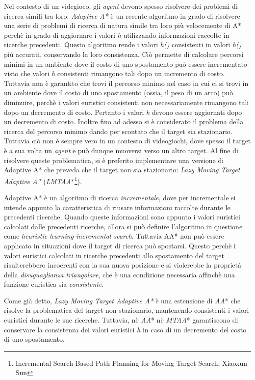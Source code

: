 \documentclass[11pt]{book}
\begin{document}
\par{Nel contesto di un videgioco, gli \emph{agent} devono spesso risolvere dei problemi di ricerca simili tra loro. \emph{Adaptive A*} \`e un recente algoritmo in grado di risolvere una serie di problemi di ricerca di natura simile tra loro pi\`u velocemente di A* perch\`e in grado di aggiornare i valori \emph{h} utilizzando informazioni raccolte in ricerche precedenti. Questo algoritmo rende i valori \emph{h()} consistenti in valori \emph{h()} pi\`u accurati, conservando la loro consistenza. Ci\`o permette di calcolare percorsi minimi in un ambiente dove il costo di uno spostamento pu\`o essere incrementato visto che valori \emph{h} consistenti rimangono tali dopo un incremento di costo. Tuttavia non \`e garantito che trovi il percorso minimo nel caso in cui ci si trovi in un ambiente dove il costo di uno spostamento (ossia, il peso di un arco) pu\`o diminuire, perch\`e i valori euristici consistenti non necessariamente rimangono tali dopo un decremento di costo. Pertanto i valori \emph{h} devono essere aggiornati dopo un decremento di costo. Inoltre fino ad adesso si \`e considerato il problema della ricerca del percorso minimo dando per scontato che il target sia stazionario. Tuttavia ci\`o non \`e sempre vero in un contesto di videogiochi, dove spesso il target \`e a sua volta un \emph{agent} e pu\`o dunque muoversi verso un altro target. Al fine di risolvere queste problematica, si \`e preferito implementare una versione di Adaptive A* che preveda che il target non sia stazionario: \emph{Lazy Moving Target Adaptive A*} (\emph{LMTAA}*\footnote{Incremental Search-Based Path Planning for Moving Target Search, Xiaoxun Sun}).}

\par{Adaptive A* \`e un algoritmo  di ricerca \emph{incrementale}, dove per incrementale si intende appunto la caratteristica di riusare informazioni raccolte durante le precedenti ricerche. Quando queste informazioni sono appunto i valori euristici calcolati dalle precedenti ricerche, allora si pu\`o definire l'algoritmo in questione come \emph{heuristic learning incremental search}. Tuttavia AA* non pu\`o essere applicato in situazioni dove il target di ricerca pu\`o spostarsi. Questo perch\`e i valori euristici calcolati in ricerche precedenti allo spostamento del target risulterebbero incoerenti con la sua nuova posizione e si violerebbe la propriet\`a della \emph{disuguaglianza triangolare}, che \`e una condizione necessaria affinch\`e una funzione euristica sia \emph{consistente}.}
\par{Come gi\`a detto, \emph{Lazy Moving Target Adaptive A*} \`e una estensione di \emph{AA}* che risolve la problematica del target non stazionario, mantenendo consistenti i valori euristici durante le sue ricerche. Tuttavia, n\`e \emph{AA}* n\`e \emph{MTAA}* garantiscono di conservare la consistenza dei valori euristici \emph{h} in caso di un decremento del costo di uno spostamento.}
\end{document}
